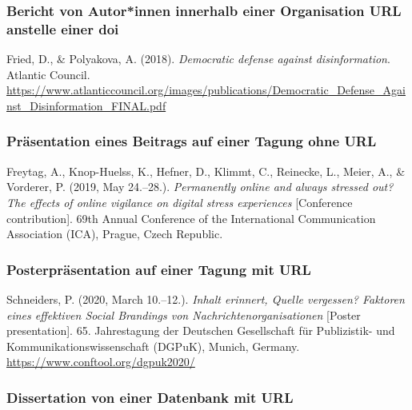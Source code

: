 \documentclass[
  letterpaper,
  DIV=11]{scrreprt}
\begin{document}
\hypertarget{bericht-von-autorinnen-innerhalb-einer-organisation-url-anstelle-einer-doi}{%
\subsubsection{Bericht von Autor*innen innerhalb einer Organisation
\textbar{} URL anstelle einer
doi}\label{bericht-von-autorinnen-innerhalb-einer-organisation-url-anstelle-einer-doi}}

Fried, D., \& Polyakova, A. (2018). \emph{Democratic defense against
disinformation}. Atlantic Council.
\url{https://www.atlanticcouncil.org/images/publications/Democratic_Defense_Against_Disinformation_FINAL.pdf}

\hypertarget{pruxe4sentation-eines-beitrags-auf-einer-tagung-ohne-url}{%
\subsubsection{Präsentation eines Beitrags auf einer Tagung \textbar{}
ohne
URL}\label{pruxe4sentation-eines-beitrags-auf-einer-tagung-ohne-url}}

Freytag, A., Knop-Huelss, K., Hefner, D., Klimmt, C., Reinecke, L.,
Meier, A., \& Vorderer, P. (2019, May 24.--28.). \emph{Permanently
online and always stressed out? The effects of online vigilance on
digital stress experiences} {[}Conference contribution{]}. 69th Annual
Conference of the International Communication Association (ICA), Prague,
Czech Republic.

\hypertarget{posterpruxe4sentation-auf-einer-tagung-mit-url}{%
\subsubsection{Posterpräsentation auf einer Tagung \textbar{} mit
URL}\label{posterpruxe4sentation-auf-einer-tagung-mit-url}}

Schneiders, P. (2020, March 10.--12.). \emph{Inhalt erinnert, Quelle
vergessen? Faktoren eines effektiven Social Brandings von
Nachrichtenorganisationen} {[}Poster presentation{]}. 65. Jahrestagung
der Deutschen Gesellschaft für Publizistik- und
Kommunikationswissenschaft (DGPuK), Munich, Germany.
\url{https://www.conftool.org/dgpuk2020/}

\hypertarget{dissertation-von-einer-datenbank-mit-url}{%
\subsubsection{Dissertation von einer Datenbank \textbar{} mit
URL}\label{dissertation-von-einer-datenbank-mit-url}}
\end{document}
